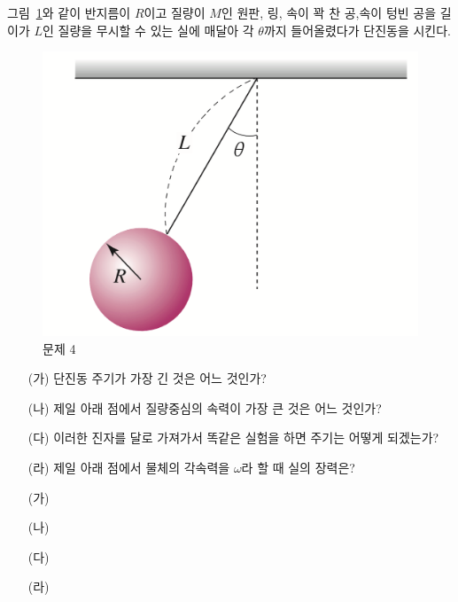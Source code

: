 \documentclass[floatfix,nofootinbib,superscriptaddress,fleqn]{revtex4-2}
\begin{document}
 \vspace{1.cm}
그림~\ref{fig:4}와 같이 반지름이 $R$이고 질량이 $M$인 원판, 링, 속이
꽉 찬 공,속이 텅빈 공을 길이가 $L$인 질량을 무시할 수 있는 실에 매달아
각 $\theta$까지 들어올렸다가 단진동을 시킨다. 
\begin{figure}[ht]
  \centering
\includegraphics[scale=0.25]{Qfig17-4-20220509.png}
  \caption{문제 4}
  \label{fig:4}
\end{figure}
\begin{itemize}
\item[(가)] 단진동 주기가 가장 긴 것은 어느 것인가?
\item[(나)] 제일 아래 점에서 질량중심의 속력이 가장 큰 것은 어느 것인가?
\item[(다)] 이러한 진자를 달로 가져가서 똑같은 실험을 하면 주기는
  어떻게 되겠는가?
\item[(라)] 제일 아래 점에서 물체의 각속력을 $\omega$라 할 때 실의 장력은? 
\end{itemize}

\begin{itemize}
  \item[(가)] 
  \item[(나)] 
  \item[(다)] 
  \item[(라)] 
\end{itemize}
\end{document}
